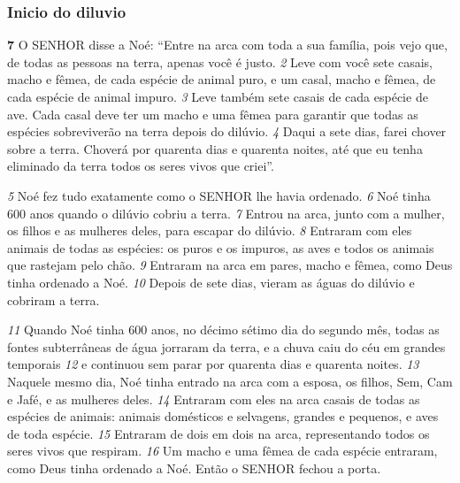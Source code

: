 \bigskip
\subsubsection*{Inicio do diluvio}
\textbf{\large 7}
 O SENHOR disse a Noé: “Entre na arca com toda a sua família, pois vejo que, de todas as pessoas na terra, apenas você é justo. 
\textit{\tiny 2}
 Leve com você sete casais, macho e fêmea, de cada espécie de animal puro, e um casal, macho e fêmea, de cada espécie de animal impuro. 
\textit{\tiny 3}
 Leve também sete casais de cada espécie de ave. Cada casal deve ter um macho e uma fêmea para garantir que todas as espécies sobreviverão na terra depois do dilúvio. 
\textit{\tiny 4}
 Daqui a sete dias, farei chover sobre a terra. Choverá por quarenta dias e quarenta noites, até que eu tenha eliminado da terra todos os seres vivos que criei”.



\bigskip
\textit{\tiny 5}
 Noé fez tudo exatamente como o SENHOR lhe havia ordenado. 
\textit{\tiny 6}
 Noé tinha 600 anos quando o dilúvio cobriu a terra. 
\textit{\tiny 7}
 Entrou na arca, junto com a mulher, os filhos e as mulheres deles, para escapar do dilúvio. 
\textit{\tiny 8}
 Entraram com eles animais de todas as espécies: os puros e os impuros, as aves e todos os animais que rastejam pelo chão. 
\textit{\tiny 9}
 Entraram na arca em pares, macho e fêmea, como Deus tinha ordenado a Noé. 
\textit{\tiny 10}
 Depois de sete dias, vieram as águas do dilúvio e cobriram a terra.



\bigskip
\textit{\tiny 11}
 Quando Noé tinha 600 anos, no décimo sétimo dia do segundo mês, todas as fontes subterrâneas de água jorraram da terra, e a chuva caiu do céu em grandes temporais 
\textit{\tiny 12}
 e continuou sem parar por quarenta dias e quarenta noites. 
\textit{\tiny 13}
 Naquele mesmo dia, Noé tinha entrado na arca com a esposa, os filhos, Sem, Cam e Jafé, e as mulheres deles. 
\textit{\tiny 14}
 Entraram com eles na arca casais de todas as espécies de animais: animais domésticos e selvagens, grandes e pequenos, e aves de toda espécie. 
\textit{\tiny 15}
 Entraram de dois em dois na arca, representando todos os seres vivos que respiram. 
\textit{\tiny 16}
 Um macho e uma fêmea de cada espécie entraram, como Deus tinha ordenado a Noé. 
Então o SENHOR fechou a porta. 

